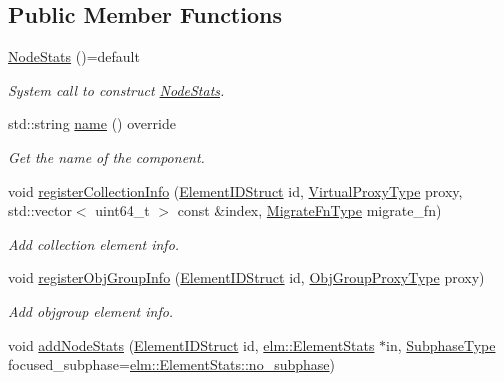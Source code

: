 \subsection*{Public Member Functions}
\begin{DoxyCompactItemize}
\item 
\hyperlink{structvt_1_1vrt_1_1collection_1_1balance_1_1_node_stats_a05936543d7f0f41a55c77fe5265ca8ed}{Node\+Stats} ()=default
\begin{DoxyCompactList}\small\item\em System call to construct {\ttfamily \hyperlink{structvt_1_1vrt_1_1collection_1_1balance_1_1_node_stats}{Node\+Stats}}. \end{DoxyCompactList}\item 
std\+::string \hyperlink{structvt_1_1vrt_1_1collection_1_1balance_1_1_node_stats_adfd9b278e017ccc02ed418c8f46bea2c}{name} () override
\begin{DoxyCompactList}\small\item\em Get the name of the component. \end{DoxyCompactList}\item 
void \hyperlink{structvt_1_1vrt_1_1collection_1_1balance_1_1_node_stats_ad016b4beb97dbb65ac0f499427e9658c}{register\+Collection\+Info} (\hyperlink{namespacevt_1_1vrt_1_1collection_1_1balance_a9f5b53fafb270212279a4757d2c4cd28}{Element\+I\+D\+Struct} id, \hyperlink{namespacevt_a1b417dd5d684f045bb58a0ede70045ac}{Virtual\+Proxy\+Type} proxy, std\+::vector$<$ uint64\+\_\+t $>$ const \&index, \hyperlink{structvt_1_1vrt_1_1collection_1_1balance_1_1_node_stats_af702e521887d9015e33a7aedda48d09d}{Migrate\+Fn\+Type} migrate\+\_\+fn)
\begin{DoxyCompactList}\small\item\em Add collection element info. \end{DoxyCompactList}\item 
void \hyperlink{structvt_1_1vrt_1_1collection_1_1balance_1_1_node_stats_a67e3dd9ffd1df3ca16a7b57ba01ac0f4}{register\+Obj\+Group\+Info} (\hyperlink{namespacevt_1_1vrt_1_1collection_1_1balance_a9f5b53fafb270212279a4757d2c4cd28}{Element\+I\+D\+Struct} id, \hyperlink{namespacevt_ad7cae989df485fccca57f0792a880a8e}{Obj\+Group\+Proxy\+Type} proxy)
\begin{DoxyCompactList}\small\item\em Add objgroup element info. \end{DoxyCompactList}\item 
void \hyperlink{structvt_1_1vrt_1_1collection_1_1balance_1_1_node_stats_a43de5f8a266e8abf23aa093a4a9e1b82}{add\+Node\+Stats} (\hyperlink{namespacevt_1_1vrt_1_1collection_1_1balance_a9f5b53fafb270212279a4757d2c4cd28}{Element\+I\+D\+Struct} id, \hyperlink{structvt_1_1elm_1_1_element_stats}{elm\+::\+Element\+Stats} $\ast$in, \hyperlink{namespacevt_ae78cbfdf1e57470e33eedb074f2beeba}{Subphase\+Type} focused\+\_\+subphase=\hyperlink{structvt_1_1elm_1_1_element_stats_a6d338e3acd9504dc88d6664a24e567ce}{elm\+::\+Element\+Stats\+::no\+\_\+subphase})

\end{DoxyCompactItemize}
